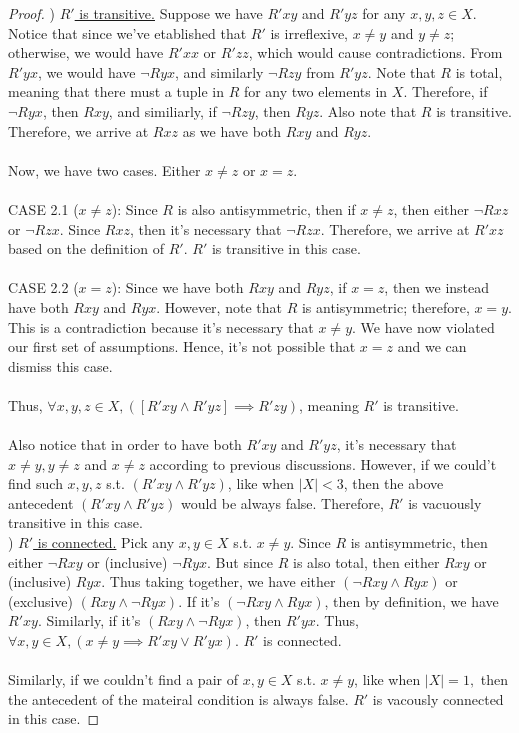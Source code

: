 \documentclass[12pt]{article}
\begin{document}
\begin{proof}
    ) \underline{$R'$ is transitive.}
    Suppose we have $R'xy$ and $R'yz$ for any $x,y,z \in X$. 
    Notice that since we've etablished that $R'$ is irreflexive, $x \neq y$ and $y \neq z$; 
    otherwise, we would have $R'xx$ or $R'zz$, which would cause contradictions.
    From $R'yx$, we would have $\neg Ryx$, and similarly $\neg Rzy$ from $R'yz$. 
    Note that $R$ is total, meaning that there must a tuple in $R$ for any two elements in $X$. 
    Therefore, if $\neg Ryx$, then $Rxy$, and similiarly, if $\neg Rzy$, then $Ryz$.
    Also note that $R$ is transitive. Therefore, we arrive at $Rxz$ as we have both $Rxy$ and $Ryz$.\\
    \\
    Now, we have two cases. Either $x \neq z$ or $x = z$.\\
    \\
    CASE 2.1 ($x \neq z$): 
    Since $R$ is also antisymmetric, then if $x \neq z$, then either $\neg Rxz$ or $\neg Rzx$. Since $Rxz$, then it's necessary that $\neg Rzx$.
    Therefore, we arrive at $R'xz$ based on the definition of $R'$. $R'$ is transitive in 
    this case.\\
    \\
    CASE 2.2 ($x = z$): 
    Since we have both $Rxy$ and $Ryz$, if $x = z$, then we instead have both $Rxy$ and $Ryx$. 
    However, note that $R$ is antisymmetric; therefore, $x = y$.
    This is a contradiction because it's necessary that $x \neq y$.
    We have now violated our first set of assumptions. 
    Hence, it's not possible that $x = z$ and we can dismiss this case.\\
    \\
    Thus, $\forall x,y,z \in X, ([R'xy \land R'yz] \implies R'zy)$, meaning $R'$ is transitive.\\
    \\
    Also notice that in order to have both $R'xy$ and $R'yz$, it's necessary that $x \neq y, y \neq z$ and $x \neq z$ according to previous discussions.
    However, if we could't find such $x,y,z$ s.t. $(R'xy \land R'yz)$, like when $|X|<3$, then the above antecedent $(R'xy \wedge R'yz)$ would be always false.
    Therefore, $R'$ is vacuously transitive in this case.\\

    ) \underline{$R'$ is connected.}
    Pick any $x,y \in X$ s.t. $x \neq y$. 
    Since $R$ is antisymmetric, then either $\neg Rxy$ or (inclusive) $\neg Ryx$.
    But since $R$ is also total, then either $Rxy$ or (inclusive) $Ryx$.
    Thus taking together, we have either $(\neg Rxy \land Ryx)$ or (exclusive) $(Rxy \land \neg Ryx)$.
    If it's $(\neg Rxy \land Ryx)$, then by definition, we have $R'xy$.
    Similarly, if it's $(Rxy \land \neg Ryx)$, then $R'yx$.
    Thus, $\forall x, y \in X, (x \neq y \implies R'xy \lor R'yx)$.
    $R'$ is connected.\\
    \\
    Similarly, if we couldn't find a pair of $x, y \in X$ s.t. $x \neq y$, like when $|X| = 1,$ then the antecedent of the mateiral condition is always false.
    $R'$ is vacously connected in this case.




\end{proof}
\end{document}
